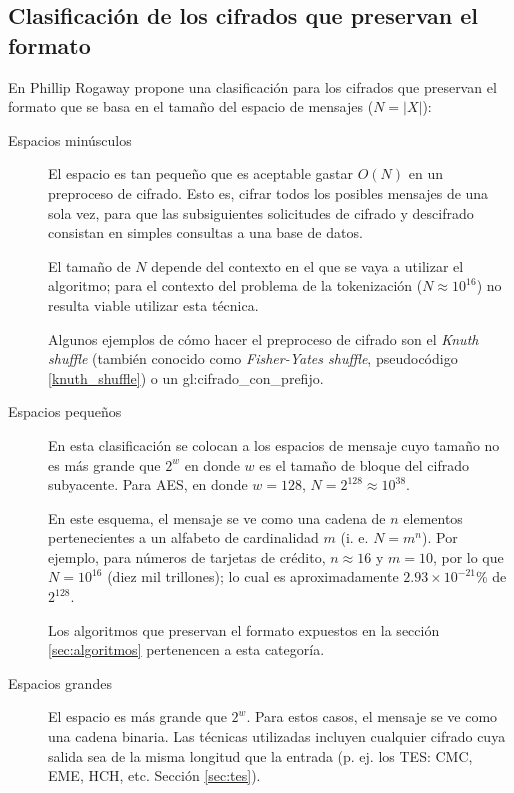 \subsection{Clasificación de los cifrados que preservan el formato}

En \cite{sinopsis_rogaway} Phillip Rogaway propone una clasificación para los
cifrados que preservan el formato que se basa en el tamaño del espacio de
mensajes ($ N = |X| $):

\begin{description}

  \item[Espacios minúsculos]

    El espacio es tan pequeño que es aceptable gastar $ O(N) $ en un preproceso
    de cifrado. Esto es, cifrar todos los posibles mensajes de una sola vez,
    para que las subsiguientes solicitudes de cifrado y descifrado consistan en
    simples consultas a una base de datos.

    El tamaño de $ N $ depende del contexto en el que se vaya a utilizar el
    algoritmo; para el contexto del problema de la tokenización
    ($ N \approx 10^{16} $) no resulta viable utilizar esta técnica.

    Algunos ejemplos de cómo hacer el preproceso de cifrado son el
    \textit{Knuth shuffle} (también conocido como \textit{Fisher-Yates shuffle},
    pseudocódigo \ref{knuth_shuffle}) o un \gls{gl:cifrado_con_prefijo}.

  \item[Espacios pequeños]

    En esta clasificación se colocan a los espacios de mensaje cuyo tamaño
    no es más grande que $ 2^w $ en donde $ w $ es el tamaño de bloque del
    cifrado subyacente. Para AES, en donde $ w = 128 $, $ N = 2^{128}
    \approx 10^{38} $.

    En este esquema, el mensaje se ve como una cadena de $ n $ elementos
    pertenecientes a un alfabeto de cardinalidad $ m $ (i. e. $ N = m^n $).
    Por ejemplo, para números de tarjetas de crédito, $ n \approx 16 $ y
    $ m = 10 $, por lo que $ N = 10^{16} $ (diez mil trillones); lo cual es
    aproximadamente $ 2.93 \times 10^{-21} \% $ de $ 2^{128} $.

    Los algoritmos que preservan el formato expuestos en la sección
    \ref{sec:algoritmos} pertenencen a esta categoría.

  \item[Espacios grandes]

    El espacio es más grande que $ 2^w $. Para estos casos, el mensaje se ve
    como una cadena binaria. Las técnicas utilizadas incluyen cualquier cifrado
    cuya salida sea de la misma longitud que la entrada (p. ej. los
    TES: CMC, EME, HCH, etc. Sección \ref{sec:tes}).

\end{description}

